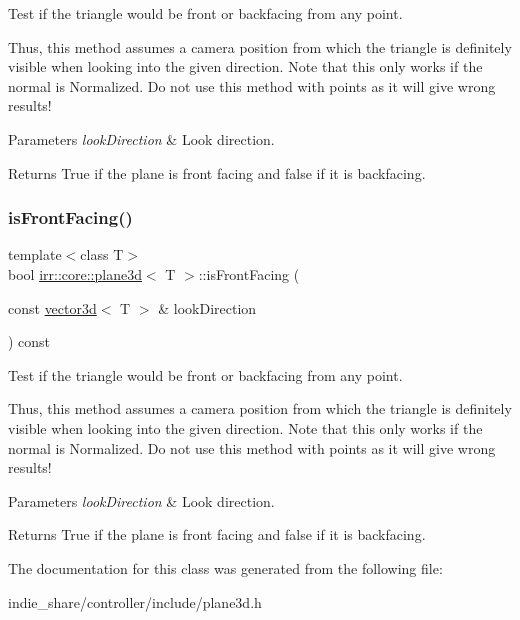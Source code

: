 Test if the triangle would be front or backfacing from any point. 

Thus, this method assumes a camera position from which the triangle is definitely visible when looking into the given direction. Note that this only works if the normal is Normalized. Do not use this method with points as it will give wrong results! 
\begin{DoxyParams}{Parameters}
{\em look\+Direction} & Look direction. \\
\hline
\end{DoxyParams}
\begin{DoxyReturn}{Returns}
True if the plane is front facing and false if it is backfacing. 
\end{DoxyReturn}
\mbox{\label{classirr_1_1core_1_1plane3d_aca0237b25cbf4fe13d87b14a04d68df9}} 
\subsubsection{\texorpdfstring{is\+Front\+Facing()}{isFrontFacing()}\hspace{0.1cm}{\footnotesize\ttfamily [2/2]}}
{\footnotesize\ttfamily template$<$class T$>$ \\
bool \hyperlink{classirr_1_1core_1_1plane3d}{irr\+::core\+::plane3d}$<$ T $>$\+::is\+Front\+Facing (\begin{DoxyParamCaption}\item[{const \hyperlink{classirr_1_1core_1_1vector3d}{vector3d}$<$ T $>$ \&}]{look\+Direction }\end{DoxyParamCaption}) const\hspace{0.3cm}{\ttfamily [inline]}}



Test if the triangle would be front or backfacing from any point. 

Thus, this method assumes a camera position from which the triangle is definitely visible when looking into the given direction. Note that this only works if the normal is Normalized. Do not use this method with points as it will give wrong results! 
\begin{DoxyParams}{Parameters}
{\em look\+Direction} & Look direction. \\
\hline
\end{DoxyParams}
\begin{DoxyReturn}{Returns}
True if the plane is front facing and false if it is backfacing. 
\end{DoxyReturn}


The documentation for this class was generated from the following file\+:\begin{DoxyCompactItemize}
\item 
indie\+\_\+share/controller/include/plane3d.\+h\end{DoxyCompactItemize}
